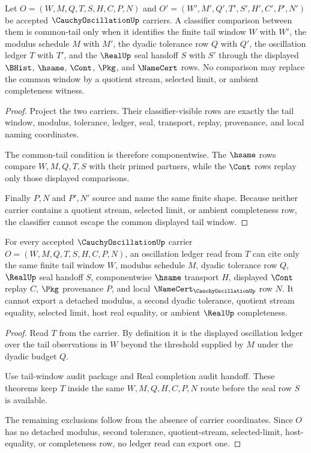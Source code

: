 \begin{theorem}
\label{thm:cauchy-oscillation-common-tail-window-classifier}
Let $O=(W,M,Q,T,S,H,C,P,N)$ and $O'=(W',M',Q',T',S',H',C',P',N')$ be accepted $\CauchyOscillationUp$ carriers. A classifier comparison between them is common-tail only when it identifies the finite tail window $W$ with $W'$, the modulus schedule $M$ with $M'$, the dyadic tolerance row $Q$ with $Q'$, the oscillation ledger $T$ with $T'$, and the $\RealUp$ seal handoff $S$ with $S'$ through the displayed $\BHist$, $\hsame$, $\Cont$, $\Pkg$, and $\NameCert$ rows. No comparison may replace the common window by a quotient stream, selected limit, or ambient completeness witness.
\end{theorem}
\begin{proof}
Project the two carriers. Their classifier-visible rows are exactly the tail window, modulus, tolerance, ledger, seal, transport, replay, provenance, and local naming coordinates.

The common-tail condition is therefore componentwise. The $\hsame$ rows compare $W,M,Q,T,S$ with their primed partners, while the $\Cont$ rows replay only those displayed comparisons.

Finally $P,N$ and $P',N'$ source and name the same finite shape. Because neither carrier contains a quotient stream, selected limit, or ambient completeness row, the classifier cannot escape the common displayed tail window.
\end{proof}

\begin{theorem}
\label{thm:cauchy-oscillation-ledger-nonescape}
For every accepted $\CauchyOscillationUp$ carrier $O=(W,M,Q,T,S,H,C,P,N)$, an oscillation ledger read from $T$ can cite only the same finite tail window $W$, modulus schedule $M$, dyadic tolerance row $Q$, $\RealUp$ seal handoff $S$, componentwise $\hsame$ transport $H$, displayed $\Cont$ replay $C$, $\Pkg$ provenance $P$, and local $\NameCert_{\CauchyOscillationUp}$ row $N$. It cannot export a detached modulus, a second dyadic tolerance, quotient stream equality, selected limit, host real equality, or ambient $\RealUp$ completeness.
\end{theorem}
\begin{proof}
Read $T$ from the carrier. By definition it is the displayed oscillation ledger over the tail observations in $W$ beyond the threshold supplied by $M$ under the dyadic budget $Q$.

Use tail-window audit package and Real completion audit handoff. These theorems keep $T$ inside the same $W,M,Q,H,C,P,N$ route before the seal row $S$ is available.

The remaining exclusions follow from the absence of carrier coordinates. Since $O$ has no detached modulus, second tolerance, quotient-stream, selected-limit, host-equality, or completeness row, no ledger read can export one.
\end{proof}

